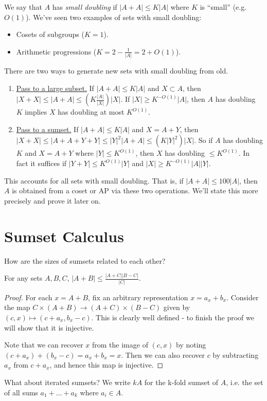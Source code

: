 \documentclass[10pt,a4paper]{article}
\begin{document}
We say that $A$ has \emph{small doubling} if $|A+A| \leq K|A|$ where $K$ is ``small'' (e.g. $O(1)$). We've seen two examples of sets with small doubling:
\begin{itemize}
  \item Cosets of subgroups ($K=1$).
  \item Arithmetic progressions ($K = 2-\frac{1}{|A|} = 2+O(1)$).
\end{itemize}
There are two ways to generate new sets with small doubling from old.
\begin{enumerate}
  \item \underline{Pass to a large subset.} If $|A+A| \leq K|A|$ and $X \subset A$, then $|X+X| \leq |A+A| \leq \left(K\frac{|A|}{|X|}\right)|X|$. If $|X| \geq K^{-O(1)}|A|$, then $A$ has doubling $K$ implies $X$ has doubling at most $K^{O(1)}$.
  \item \underline{Pass to a sumset.} If $|A+A|\leq K|A|$ and $X = A+Y$, then $|X+X| \leq |A+A+Y+Y| \leq |Y|^2|A+A| \leq (K|Y|^2)|X|$. So if $A$ has doubling $K$ and $X = A+Y$ where $|Y| \leq K^{O(1)}$, then $X$ has doubling $\leq K^{O(1)}$. In fact it suffices if $|Y+Y| \leq K^{O(1)}|Y|$ and $|X| \geq K^{-O(1)}|A||Y|$.
\end{enumerate}
This accounts for all sets with small doubling. That is, if $|A+A| \leq 100|A|$, then $A$ is obtained from a coset or AP via these two operations. We'll state this more precisely and prove it later on.
\section{Sumset Calculus}
How are the sizes of sumsets related to each other?
\begin{lemma}
  For any sets $A,B,C$, $|A+B| \leq \frac{|A+C||B-C|}{|C|}$.
\end{lemma}
\begin{proof}
  For each $x = A+B$, fix an arbitrary representation $x=a_x+b_x$. Consider the map $C\times(A+B) \to (A+C)\times (B-C)$ given by $(c,x)\mapsto (c+a_x,b_x-c)$. This is clearly well defined - to finish the proof we will show that it is injective.

  Note that we can recover $x$ from the image of $(c,x)$ by noting $(c+a_x) + (b_x-c) = a_x+b_x = x$. Then we can also recover $c$ by subtracting $a_x$ from $c+a_x$, and hence this map is injective.
\end{proof}
What about iterated sumsets? We write $kA$ for the k-fold sumset of $A$, i.e. the set of all sums $a_1+ \ldots + a_k$ where $a_i \in A$.
\end{document}
